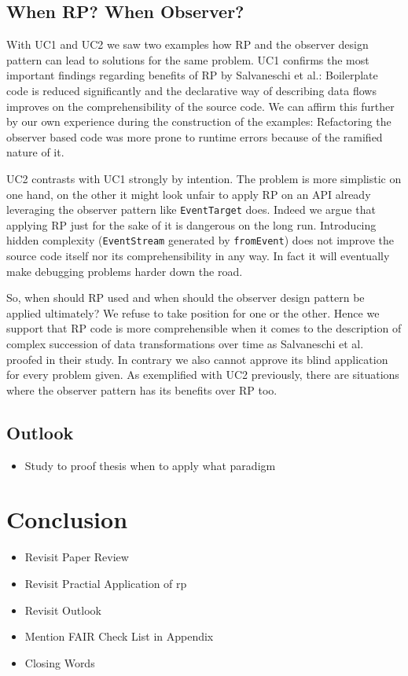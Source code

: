 \documentclass[12pt,a4paper]{article}
\begin{document}
\subsection{When RP? When Observer?}

With UC1 and UC2 we saw two examples how RP and the observer design pattern can lead to solutions for the same problem. UC1 confirms the most important findings regarding benefits of RP by Salvaneschi et al.: Boilerplate code is reduced significantly and the declarative way of describing data flows improves on the comprehensibility of the source code. We can affirm this further by our own experience during the construction of the examples: Refactoring the observer based code was more prone to runtime errors because of the ramified nature of it.

UC2 contrasts with UC1 strongly by intention. The problem is more simplistic on one hand, on the other it might look unfair to apply RP on an API already leveraging the observer pattern like \texttt{EventTarget} does. Indeed we argue that applying RP just for the sake of it is dangerous on the long run. Introducing hidden complexity (\texttt{EventStream} generated by \texttt{fromEvent}) does not improve the source code itself nor its comprehensibility in any way. In fact it will eventually make debugging problems harder down the road.

So, when should RP used and when should the observer design pattern be applied ultimately? We refuse to take position for one or the other. Hence we support that RP code is more comprehensible when it comes to the description of complex succession of data transformations over time as Salvaneschi et al. proofed in their study. In contrary we also cannot approve its blind application for every problem given. As exemplified with UC2 previously, there are situations where the observer pattern has its benefits over RP too.

\subsection{Outlook}

\begin{itemize}
	\item Study to proof thesis when to apply what paradigm
\end{itemize}

\section{Conclusion}
\begin{itemize}
	\item Revisit Paper Review
	\item Revisit Practial Application of rp
	\item Revisit Outlook
	\item Mention FAIR Check List in Appendix
	\item Closing Words
\end{itemize}
\end{document}
